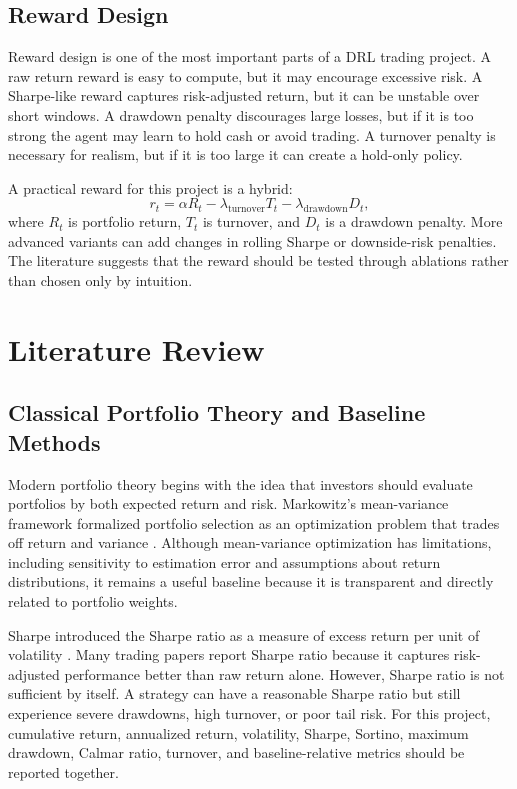 \documentclass[11pt]{article}
\begin{document}
\subsection{Reward Design}
Reward design is one of the most important parts of a DRL trading project. A raw return reward is easy to compute, but it may encourage excessive risk. A Sharpe-like reward captures risk-adjusted return, but it can be unstable over short windows. A drawdown penalty discourages large losses, but if it is too strong the agent may learn to hold cash or avoid trading. A turnover penalty is necessary for realism, but if it is too large it can create a hold-only policy.

A practical reward for this project is a hybrid:
\[
r_t = \alpha R_t - \lambda_{\mathrm{turnover}}T_t - \lambda_{\mathrm{drawdown}}D_t,
\]
where $R_t$ is portfolio return, $T_t$ is turnover, and $D_t$ is a drawdown penalty. More advanced variants can add changes in rolling Sharpe or downside-risk penalties. The literature suggests that the reward should be tested through ablations rather than chosen only by intuition.

\section{Literature Review}

\subsection{Classical Portfolio Theory and Baseline Methods}
Modern portfolio theory begins with the idea that investors should evaluate portfolios by both expected return and risk. Markowitz's mean-variance framework formalized portfolio selection as an optimization problem that trades off return and variance \cite{markowitz}. Although mean-variance optimization has limitations, including sensitivity to estimation error and assumptions about return distributions, it remains a useful baseline because it is transparent and directly related to portfolio weights.

Sharpe introduced the Sharpe ratio as a measure of excess return per unit of volatility \cite{sharpe}. Many trading papers report Sharpe ratio because it captures risk-adjusted performance better than raw return alone. However, Sharpe ratio is not sufficient by itself. A strategy can have a reasonable Sharpe ratio but still experience severe drawdowns, high turnover, or poor tail risk. For this project, cumulative return, annualized return, volatility, Sharpe, Sortino, maximum drawdown, Calmar ratio, turnover, and baseline-relative metrics should be reported together.
\end{document}
